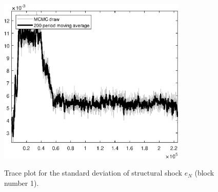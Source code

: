 \begin{figure}[H]
\centering
  \includegraphics[width=0.8\textwidth]{BRS_sectoral/graphs/TracePlot_SE_e_N_blck_1}\\
    \caption{Trace plot for the standard deviation of structural shock ${e_N}$ (block number 1).}
\end{figure}
